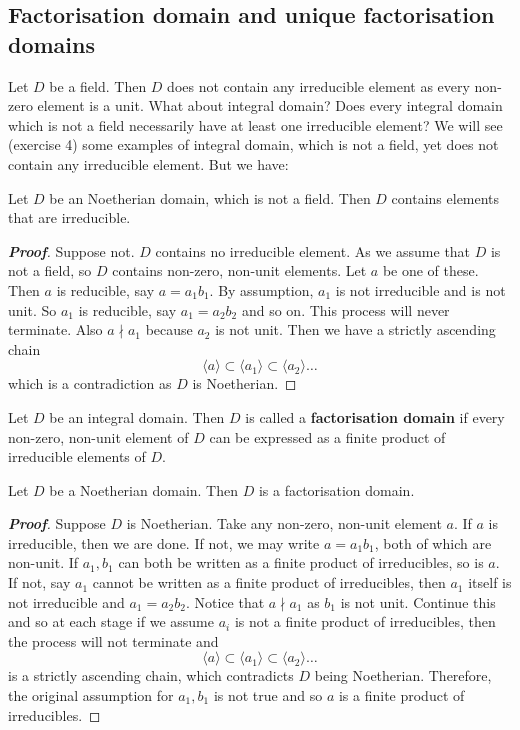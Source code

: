 \subsection{Factorisation domain and unique factorisation domains}
Let $D$ be a field. Then $D$ does not contain any irreducible element as every non-zero element is a unit. What about integral domain?
Does every integral domain which is not a field necessarily have at least one irreducible element?
We will see (exercise 4) some examples of integral domain, which is not a field, yet does not contain any irreducible element. But we have:
\begin{theorem} Let $D$ be an Noetherian domain, which is not a field. Then $D$ contains elements that are irreducible.
\end{theorem}
\begin{proof}[\bf Proof] Suppose not. $D$ contains no irreducible element. As we assume that $D$ is not a field, so $D$ contains non-zero, non-unit elements. Let $a$ be one of these. Then $a$ is reducible, say
$a=a_1 b_1$. By assumption, $a_1$ is not irreducible and is not unit. So $a_1$ is reducible, say
$a_1=a_2 b_2$ and so on. This process will never terminate. Also $a \nmid a_1$ because $a_2$ is not unit. Then we have a strictly ascending chain
$$\langle a \rangle \subset \langle a_1 \rangle \subset \langle a_2 \rangle \ldots$$
which is a contradiction as $D$ is Noetherian.
\end{proof}
\begin{definition} Let $D$ be an integral domain. Then $D$ is called a {\bf factorisation domain} if every non-zero, non-unit element of $D$ can be expressed as a finite product of irreducible elements of $D$.
\end{definition}
\begin{theorem} Let $D$ be a Noetherian domain. Then $D$ is a factorisation domain.
\end{theorem}
\begin{proof}[\bf Proof] Suppose $D$ is Noetherian. Take any non-zero, non-unit element $a$. If $a$ is irreducible, then we are done. If not, we may write $a=a_1b_1$, both of which are non-unit. If $a_1,b_1$ can both be written as a finite product of irreducibles, so is $a$. If not, say $a_1$ cannot be written as a finite product of irreducibles, then $a_1$ itself is not irreducible and $a_1=a_2 b_2$. Notice that $a \nmid a_1$ as $b_1$ is not unit. Continue this and so at each stage if we assume $a_i$ is not a finite product of irreducibles, then the process will not terminate and
$$\langle a \rangle \subset \langle a_1 \rangle \subset \langle a_2 \rangle \ldots$$
is a strictly ascending chain, which contradicts $D$ being Noetherian. Therefore, the original assumption for $a_1,b_1$ is not true and so $a$ is a finite product of irreducibles.
\end{proof}
